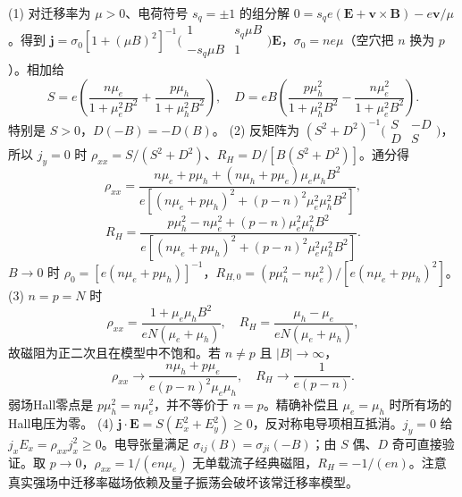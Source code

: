 (1) 对迁移率为 \(\mu>0\)、电荷符号 \(s_q=\pm1\) 的组分解 \(0=s_q e(\mathbf E+\mathbf v\times\mathbf B)-e\mathbf v/\mu\)。得到 \(\mathbf j=\sigma_0[1+(\mu B)^2]^{-1}\bigl(\begin{smallmatrix}1&s_q\mu B\\-s_q\mu B&1\end{smallmatrix}\bigr)\mathbf E\)，\(\sigma_0=ne\mu\)（空穴把 \(n\) 换为 \(p\)）。相加给
\[
S=e\!\left(\frac{n\mu_e}{1+\mu_e^2B^2}+\frac{p\mu_h}{1+\mu_h^2B^2}\right),\quad
D=eB\!\left(\frac{p\mu_h^2}{1+\mu_h^2B^2}-\frac{n\mu_e^2}{1+\mu_e^2B^2}\right).
\]
特别是 \(S>0\)，\(D(-B)=-D(B)\)。
(2) 反矩阵为 \((S^2+D^2)^{-1}\bigl(\begin{smallmatrix}S&-D\\D&S\end{smallmatrix}\bigr)\)，所以 \(j_y=0\) 时 \(\rho_{xx}=S/(S^2+D^2)\)、\(R_H=D/[B(S^2+D^2)]\)。通分得
\[
\boxed{\rho_{xx}=\frac{n\mu_e+p\mu_h+(n\mu_h+p\mu_e)\mu_e\mu_hB^2}{e[(n\mu_e+p\mu_h)^2+(p-n)^2\mu_e^2\mu_h^2B^2]}},
\]
\[
\boxed{R_H=\frac{p\mu_h^2-n\mu_e^2+(p-n)\mu_e^2\mu_h^2B^2}{e[(n\mu_e+p\mu_h)^2+(p-n)^2\mu_e^2\mu_h^2B^2]}}.
\]
\(B\to0\) 时 \(\rho_0=[e(n\mu_e+p\mu_h)]^{-1}\)，\(R_{H,0}=(p\mu_h^2-n\mu_e^2)/[e(n\mu_e+p\mu_h)^2]\)。
(3) \(n=p=N\) 时
\[
\rho_{xx}=\frac{1+\mu_e\mu_hB^2}{eN(\mu_e+\mu_h)},\quad
R_H=\frac{\mu_h-\mu_e}{eN(\mu_e+\mu_h)},
\]
故磁阻为正二次且在模型中不饱和。若 \(n\ne p\) 且 \(|B|\to\infty\)，
\[
\rho_{xx}\to\frac{n\mu_h+p\mu_e}{e(p-n)^2\mu_e\mu_h},\quad R_H\to\frac{1}{e(p-n)}.
\]
弱场Hall零点是 \(p\mu_h^2=n\mu_e^2\)，并不等价于 \(n=p\)。精确补偿且 \(\mu_e=\mu_h\) 时所有场的Hall电压为零。
(4) \(\mathbf j\cdot\mathbf E=S(E_x^2+E_y^2)\ge0\)，反对称电导项相互抵消。\(j_y=0\) 给 \(j_xE_x=\rho_{xx}j_x^2\ge0\)。电导张量满足 \(\sigma_{ij}(B)=\sigma_{ji}(-B)\)；由 \(S\) 偶、\(D\) 奇可直接验证。取 \(p\to0\)，\(\rho_{xx}=1/(en\mu_e)\) 无单载流子经典磁阻，\(R_H=-1/(en)\)。注意真实强场中迁移率磁场依赖及量子振荡会破坏该常迁移率模型。
